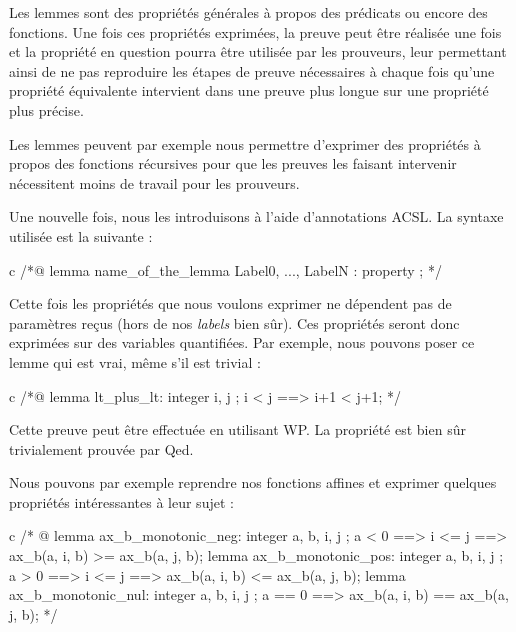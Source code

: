 
Les lemmes sont des propriétés générales à propos des prédicats ou encore des 
fonctions. Une fois ces propriétés exprimées, la preuve peut être réalisée une 
fois et la propriété en question pourra être utilisée par les prouveurs, leur 
permettant ainsi de ne pas reproduire les étapes de preuve nécessaires à chaque
fois qu'une propriété équivalente intervient dans une preuve plus longue sur 
une propriété plus précise.



Les lemmes peuvent par exemple nous permettre d'exprimer des propriétés à 
propos des fonctions récursives pour que les preuves les faisant intervenir 
nécessitent moins de travail pour les prouveurs.





Une nouvelle fois, nous les introduisons à l'aide d'annotations ACSL. La syntaxe
utilisée est la suivante :



\begin{CodeBlock}{c}
/*@
  lemma name_of_the_lemma { Label0, ..., LabelN }:
    property ;
*/
\end{CodeBlock}



Cette fois les propriétés que nous voulons exprimer ne dépendent pas de 
paramètres reçus (hors de nos \textit{labels} bien sûr). Ces propriétés seront donc 
exprimées sur des variables quantifiées. Par exemple, nous pouvons poser ce 
lemme qui est vrai, même s'il est trivial :



\begin{CodeBlock}{c}
/*@
  lemma lt_plus_lt:
    \forall integer i, j ; i < j ==> i+1 < j+1;
*/
\end{CodeBlock}



Cette preuve peut être effectuée en utilisant WP. La propriété est bien sûr 
trivialement prouvée par Qed.





Nous pouvons par exemple reprendre nos fonctions affines et exprimer quelques 
propriétés intéressantes à leur sujet :



\begin{CodeBlock}{c}
/* @
  lemma ax_b_monotonic_neg:
    \forall integer a, b, i, j ;
      a <  0 ==> i <= j ==> ax_b(a, i, b) >= ax_b(a, j, b);
  lemma ax_b_monotonic_pos:
    \forall integer a, b, i, j ;
      a >  0 ==> i <= j ==> ax_b(a, i, b) <= ax_b(a, j, b);
  lemma ax_b_monotonic_nul:
    \forall integer a, b, i, j ;
      a == 0 ==> ax_b(a, i, b) == ax_b(a, j, b);
*/
\end{CodeBlock}



